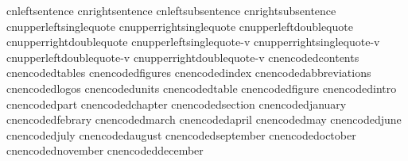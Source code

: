    cnleftsentence            {}
   cnrightsentence           {}
   cnleftsubsentence         {}
   cnrightsubsentence        {}
   cnupperleftsinglequote    {}
   cnupperrightsinglequote   {}
   cnupperleftdoublequote    {}
   cnupperrightdoublequote   {}
   cnupperleftsinglequote-v  {}
   cnupperrightsinglequote-v {}
   cnupperleftdoublequote-v  {}
   cnupperrightdoublequote-v {}
   cnencodedcontents         {}
   cnencodedtables           {}
   cnencodedfigures          {}
   cnencodedindex            {}
   cnencodedabbreviations    {}
   cnencodedlogos            {}
   cnencodedunits            {}
   cnencodedtable            {}
   cnencodedfigure           {}
   cnencodedintro            {}
   cnencodedpart             {}
   cnencodedchapter          {}
   cnencodedsection          {}
   cnencodedjanuary          {}
   cnencodedfebrary          {}
   cnencodedmarch            {}
   cnencodedapril            {}
   cnencodedmay              {}
   cnencodedjune             {}
   cnencodedjuly             {}
   cnencodedaugust           {}
   cnencodedseptember        {}
   cnencodedoctober          {}
   cnencodednovember         {}
   cnencodeddecember         {}
